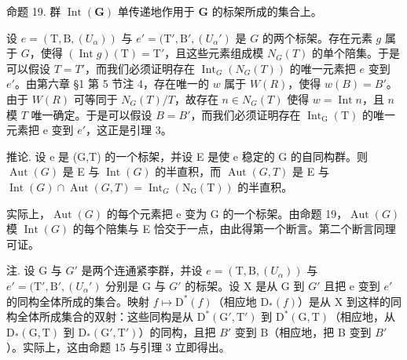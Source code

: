 命题 19. 群 \(\operatorname{Int}(\mathbf{G})\) 单传递地作用于 \(\mathbf{G}\) 的标架所成的集合上。

设 \(e = (\mathrm{T}, \mathrm{B}, (U_{\alpha}))\) 与 \(e' = (\mathrm{T}', \mathrm{B}', (U_{\alpha}')\) 是 \(G\) 的两个标架。存在元素 \(g\) 属于 \(G\)，使得 \((\operatorname{Int} g)(\mathrm{T}) = \mathrm{T}'\)，且这些元素组成模 \(N_G(T)\) 的单个陪集。于是可以假设 \(T = T'\)，而我们必须证明存在 \(\operatorname{Int}_G(N_G(T))\) 的唯一元素把 \(e\) 变到 \(e'\)。由第六章 §1 第 5 节注 4，存在唯一的 \(w\) 属于 \(W(R)\)，使得 \(w(B) = B'\)。由于 \(W(R)\) 可等同于 \(N_G(T)/T\)，故存在 \(n \in N_G(T)\) 使得 \(w = \operatorname{Int} n\)，且 \(n\) 模 \(T\) 唯一确定。于是可以假设 \(B = B'\)，而我们必须证明存在 \(\operatorname{Int}_{\mathrm{G}}(\mathrm{T})\) 的唯一元素把 e 变到 \(e'\)，这正是引理 3。

推论. 设 e 是 (G,T) 的一个标架，并设 E 是使 e 稳定的 G 的自同构群。则 \(\operatorname{Aut}(G)\) 是 E 与 \(\operatorname{Int}(G)\) 的半直积，而 \(\operatorname{Aut}(G,T)\) 是 E 与 \(\operatorname{Int}(G)\cap\operatorname{Aut}(G,T)=\operatorname{Int}_{G}(\mathrm{N}_{\mathrm{G}}(\mathrm{T}))\) 的半直积。

实际上，\(\operatorname{Aut}(G)\) 的每个元素把 e 变为 G 的一个标架。由命题 19，\(\operatorname{Aut}(G)\) 模 \(\operatorname{Int}(G)\) 的每个陪集与 E 恰交于一点，由此得第一个断言。第二个断言同理可证。

注. 设 G 与 \(G'\) 是两个连通紧李群，并设 \(e = (\mathrm{T}, \mathrm{B}, (U_{\alpha}))\) 与 \(e' = (\mathrm{T}', \mathrm{B}', (U_{\alpha}')\) 分别是 G 与 \(G'\) 的标架。设 X 是从 G 到 \(G'\) 且把 e 变到 \(e'\) 的同构全体所成的集合。映射 \(f \mapsto \mathrm{D}^{*}(f)\)（相应地 \(\mathrm{D}_{*}(f)\)）是从 X 到这样的同构全体所成集合的双射：这些同构是从 \(\mathrm{D}^{*}(\mathrm{G}', \mathrm{T}')\) 到 \(\mathrm{D}^{*}(\mathrm{G}, \mathrm{T})\)（相应地，从 \(\mathrm{D}_{*}(\mathrm{G}, \mathrm{T})\) 到 \(\mathrm{D}_{*}(\mathrm{G}', \mathrm{T}')\)）的同构，且把 \(B'\) 变到 B（相应地，把 B 变到 \(B'\)）。实际上，这由命题 15 与引理 3 立即得出。

